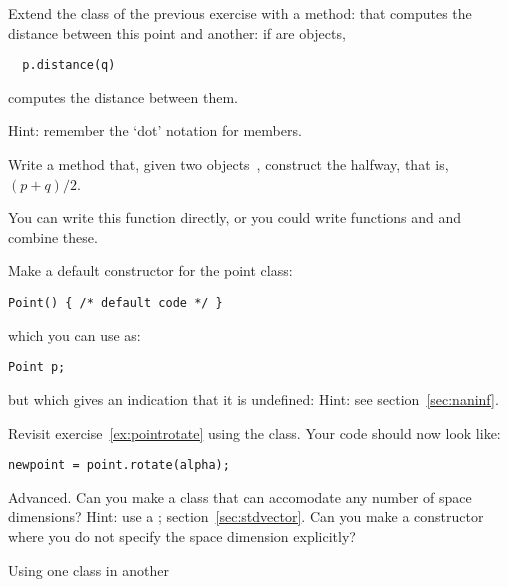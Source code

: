 \begin{exercise}
  \label{ex:geom:pointpoint}
  Extend the  class of the previous exercise with a method:
   that computes the distance between this point and
  another: if  are  objects,
\begin{verbatim}
  p.distance(q) 
\end{verbatim}
computes the distance between them.

Hint: remember the `dot' notation for members.
\end{exercise}

\begin{exercise}
  \label{ex:geom:pointhalfway}
  Write a method  that, given two 
  objects~, construct the  halfway, that
  is,~$(p+q)/2$.

  You can write this function directly, or you could write functions
   and  and combine these.
\end{exercise}

\begin{exercise}
  Make a default constructor for the point class:
\begin{verbatim}
Point() { /* default code */ }
\end{verbatim}
  which you can use as:
\begin{verbatim}
Point p;
\end{verbatim}
but which gives an indication that it is undefined:
%
%
Hint: see section~\ref{sec:naninf}.
\end{exercise}

\begin{exercise}
  \label{ex:pointrotate-class}
  Revisit exercise~\ref{ex:pointrotate} using the 
  class. Your code should now look like:
\begin{verbatim}
newpoint = point.rotate(alpha);
\end{verbatim}
\end{exercise}

\begin{exercise}
  Advanced. Can you make a  class that can accomodate any
  number of space dimensions? Hint: use a ;
  section~\ref{sec:stdvector}. Can you make a constructor where you do
  not specify the space dimension explicitly?
\end{exercise}

 {Using one class in another}
\label{sec:FuncHasPoint}
\label{sec:poly-rectangle}

